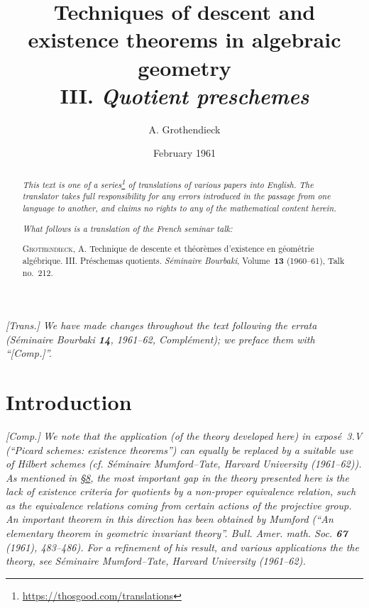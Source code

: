\documentclass{article}
\title{Techniques of descent and existence theorems in algebraic geometry\\III. \emph{Quotient preschemes}}
\author{A. Grothendieck}
\date{February 1961}
\newcommand{\doctype}{French seminar talk}
\newcommand{\origcit}{%
  \textsc{Grothendieck, A.}
  Technique de descente et th\'{e}or\`{e}mes d'existence en g\'{e}om\'{e}trie alg\'{e}brique. III. Pr\'{e}schemas quotients.
  \emph{S\'{e}minaire Bourbaki}, Volume~\textbf{13} (1960--61), Talk no.~212.%
}
\newcommand{\oldpage}[1]{\marginpar{\footnotesize$\Big\vert$ \textit{p.~#1}}}
\begin{document}
\maketitle
\thispagestyle{fancy}

\renewcommand{\abstractname}{Translator's note.}

\begin{abstract}
  \renewcommand*{\thefootnote}{\fnsymbol{footnote}}
  \emph{This text is one of a series\footnote{\url{https://thosgood.com/translations}} of translations of various papers into English.}
  \emph{The translator takes full responsibility for any errors introduced in the passage from one language to another, and claims no rights to any of the mathematical content herein.}

  \medskip
  
  \emph{What follows is a translation of the \doctype:}

  \medskip\noindent
  \origcit
\end{abstract}

\setcounter{footnote}{0}

\setcounter{tocdepth}{1}
\tableofcontents



\subsubsection*{}

\emph{[Trans.] We have made changes throughout the text following the errata (\emph{S\'{e}minaire Bourbaki} \textbf{14}, 1961--62, Compl\'{e}ment); we preface them with ``[Comp.]''.}
\medskip


\section*{Introduction}
\oldpage{212-01}

\emph{[Comp.]}
\emph{We note that the application (of the theory developed here) in expos\'{e}~3.V (``Picard schemes: existence theorems'') can equally be replaced by a suitable use of Hilbert schemes (cf. {\normalfont S\'{e}minaire Mumford--Tate, Harvard University (1961--62)}). As mentioned in \hyperref[8]{\S8}, the most important gap in the theory presented here is the lack of existence criteria for quotients by a non-proper equivalence relation, such as the equivalence relations coming from certain actions of the projective group. An important theorem in this direction has been obtained by Mumford ({\normalfont ``An elementary theorem in geometric invariant theory''. \emph{Bull. Amer. math. Soc.} \textbf{67} (1961), 483--486}). For a refinement of his result, and various applications the the theory, see {\normalfont S\'{e}minaire Mumford--Tate, Harvard University (1961--62)}.}
\medskip
\end{document}
